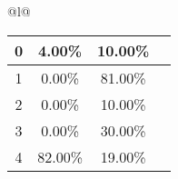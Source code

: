 \begin{longtable}{@{}l@{}}
\begin{minipage}{\textwidth}
\begin{tabular}{|c|c|c|c|}
0 & 4.00\% & 10.00\% & \textcolor{green}{\ding{51}} \\ \hline
1 & 0.00\% & 81.00\% & \textcolor{green}{\ding{51}} \\ \hline
2 & 0.00\% & 10.00\% & \textcolor{green}{\ding{51}} \\ \hline
3 & 0.00\% & 30.00\% & \textcolor{green}{\ding{51}} \\ \hline
4 & 82.00\% & 19.00\% & \textcolor{red}{\ding{55}} \\ \hline
\end{tabular}
\end{minipage}\\[2ex]
\end{longtable}